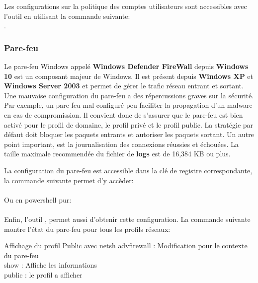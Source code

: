 \documentclass[twoside,a4paper,12pt,titlepage]{book}
\begin{document}
Les configurations sur la politique des comptes utilisateurs sont accessibles avec l'outil   en utilisant la commande suivante:\\ .\\

\subsubsection{Pare-feu}
Le pare-feu Windows appelé \textbf{Windows Defender FireWall} depuis \textbf{Windows 10} est un composant majeur de Windows. Il est présent depuis  \textbf{Windows XP} et  \textbf{Windows Server 2003} et permet de gérer le trafic réseau entrant et sortant. Une mauvaise configuration du pare-feu a des répercussions graves sur la sécurité. Par exemple, un pare-feu mal configuré peu faciliter la propagation d'un malware en cas de compromission.
Il convient donc de s'assurer que le pare-feu est bien activé pour le profil de domaine, le profil privé et le profil public. La stratégie par défaut doit bloquer les paquets entrants et autoriser les paquets sortant. Un autre point important, est la journalisation des connexions réussies et échouées. La taille maximale recommendée du fichier de \textbf{logs} est de 16,384 KB ou plus.

La configuration du pare-feu est accessible dans la clé de registre correspondante, la commande suivante permet d'y accèder:\\
\\
Ou en powershell pur:\\
\\
Enfin, l'outil , permet aussi d'obtenir cette configuration. La commande suivante montre l'état du pare-feu pour tous les profils réseaux:\\
\begin{FlagConsole}{Affichage du profil Public avec netsh }
\tcblower
advfirewall : Modification pour le contexte du pare-feu\\
show : Affiche les informations\\
public : le profil a afficher\\
\end{FlagConsole}
\end{document}
